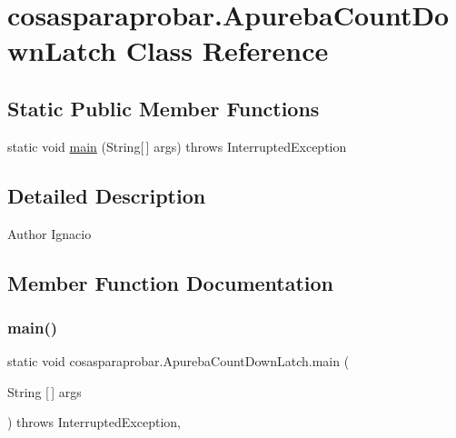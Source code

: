 \hypertarget{classcosasparaprobar_1_1_apureba_count_down_latch}{}\section{cosasparaprobar.\+Apureba\+Count\+Down\+Latch Class Reference}
\label{classcosasparaprobar_1_1_apureba_count_down_latch}
\subsection*{Static Public Member Functions}
\begin{DoxyCompactItemize}
\item 
static void \mbox{\hyperlink{classcosasparaprobar_1_1_apureba_count_down_latch_a6b46f21184021f17c81dd720483da08d}{main}} (String\mbox{[}$\,$\mbox{]} args)  throws Interrupted\+Exception 
\end{DoxyCompactItemize}


\subsection{Detailed Description}
\begin{DoxyAuthor}{Author}
Ignacio 
\end{DoxyAuthor}


\subsection{Member Function Documentation}
\mbox{\label{classcosasparaprobar_1_1_apureba_count_down_latch_a6b46f21184021f17c81dd720483da08d}} 
\subsubsection{\texorpdfstring{main()}{main()}}
{\footnotesize\ttfamily static void cosasparaprobar.\+Apureba\+Count\+Down\+Latch.\+main (\begin{DoxyParamCaption}\item[{String \mbox{[}$\,$\mbox{]}}]{args }\end{DoxyParamCaption}) throws Interrupted\+Exception\hspace{0.3cm}{\ttfamily [inline]}, {\ttfamily [static]}}


